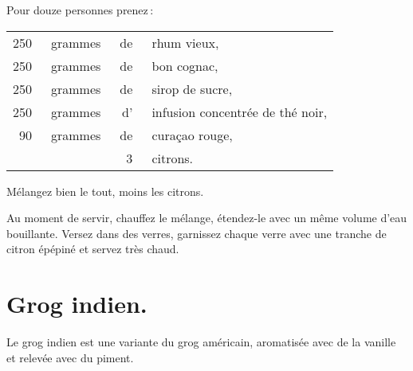 \medskip

Pour douze personnes prenez :

\footnotesize
\begin{longtable}{rrrp{16em}}
    250 & grammes & de & rhum vieux,                                                                      \\
    250 & grammes & de & bon cognac,                                                                      \\
    250 & grammes & de & sirop de sucre,                                                                  \\
    250 & grammes & d' & infusion concentrée de thé noir,                                                 \\
     90 & grammes & de & curaçao rouge,                                                                   \\
        &         &  3 & citrons.                                                                         \\
\end{longtable}
\normalsize

Mélangez bien le tout, moins les citrons.

Au moment de servir, chauffez le mélange, étendez-le avec un même volume d'eau
bouillante. Versez dans des verres, garnissez chaque verre avec une tranche de
citron épépiné et servez très chaud.

\section*{\centering Grog indien.}
{}

Le grog indien est une variante du grog américain, aromatisée avec de la vanille
et relevée avec du piment.

\sk
